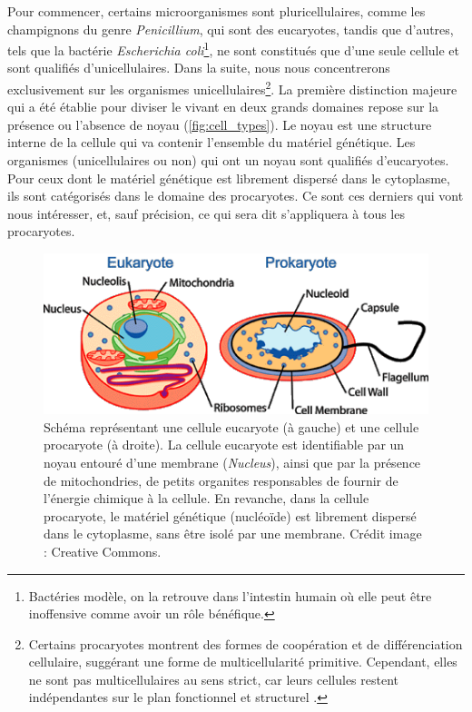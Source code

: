 Pour commencer, certains microorganismes sont pluricellulaires, comme les champignons du genre \textit{Penicillium}, qui sont des eucaryotes, tandis que d'autres, tels que la bactérie \textit{Escherichia coli}\footnote{Bactéries modèle, on la retrouve dans l'intestin humain où elle peut être inoffensive comme avoir un rôle bénéfique.}, ne sont constitués que d'une seule cellule et sont qualifiés d'unicellulaires. Dans la suite, nous nous concentrerons exclusivement sur les organismes unicellulaires\footnote{Certains procaryotes montrent des formes de coopération et de différenciation cellulaire, suggérant une forme de multicellularité primitive. Cependant, elles ne sont pas multicellulaires au sens strict, car leurs cellules restent indépendantes sur le plan fonctionnel et structurel \cite{wilpiszeski_soil_2019}.}. 
La première distinction majeure qui a été établie pour diviser le vivant en deux grands domaines repose sur la présence ou l'absence de noyau (\autoref{fig:cell_types}). Le noyau est une structure interne de la cellule qui va contenir l'ensemble du matériel génétique. Les organismes (unicellulaires ou non) qui ont un noyau sont qualifiés d'eucaryotes. Pour ceux dont le matériel génétique est librement dispersé dans le cytoplasme, ils sont catégorisés dans le domaine des procaryotes. Ce sont ces derniers qui vont nous intéresser, et, sauf précision, ce qui sera dit s'appliquera à tous les procaryotes.

\begin{figure}[htbp]
    \centering
    \includegraphics[width=0.6\linewidth]{images/Celltypes.png}
    \caption[Schéma cellules eucaryotes et procaryotes]{Schéma représentant une cellule eucaryote (à gauche) et une cellule procaryote (à droite). La cellule eucaryote est identifiable par un noyau entouré d'une membrane (\textit{Nucleus}), ainsi que par la présence de mitochondries, de petits organites responsables de fournir de l'énergie chimique à la cellule. En revanche, dans la cellule procaryote, le matériel génétique (nucléoïde) est librement dispersé dans le cytoplasme, sans être isolé par une membrane. Crédit image : Creative Commons.}
    \label{fig:cell_types}
\end{figure}

